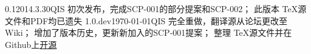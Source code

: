 


\begin{versionhistory}
	\vhEntry
	{0.1}{2014.3.30}{QIS}{
		初次发布，完成SCP-001的部分提案和SCP-002；
		此版本 \TeX 源文件和PDF均已遗失
	}
	\vhEntry
	{1.0.dev}{\today}{QIS}{
		完全重做，翻译源从论坛更改至Wiki；
		增加了版本历史，更新新加入的SCP-001提案；
		整理 \TeX 源文件并在Github上\href{https://github.com/7sDream/scp-pdf}{开源}
	}
\end{versionhistory}
\thispagestyle{plain}
